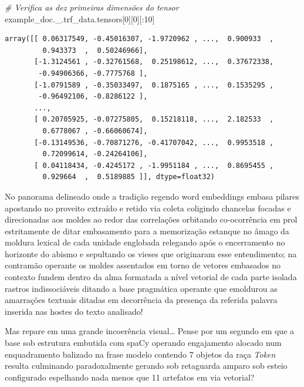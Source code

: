 \documentclass[
  brazilian,
]{article}
\newenvironment{Shaded}{}{}
\newcommand{\CommentTok}[1]{\textcolor[rgb]{0.38,0.63,0.69}{\textit{#1}}}
\newcommand{\DecValTok}[1]{\textcolor[rgb]{0.25,0.63,0.44}{#1}}
\newcommand{\NormalTok}[1]{#1}
\begin{document}
\begin{Shaded}
\begin{Highlighting}[]
\CommentTok{\# Verifica as dez primeiras dimensões do tensor}
\NormalTok{example\_doc.\_.trf\_data.tensors[}\DecValTok{0}\NormalTok{][}\DecValTok{0}\NormalTok{][:}\DecValTok{10}\NormalTok{]}
\end{Highlighting}
\end{Shaded}

\begin{verbatim}
array([[ 0.06317549, -0.45016307, -1.9720962 , ...,  0.900933  ,
         0.943373  ,  0.50246966],
       [-1.3124561 , -0.32761568,  0.25198612, ...,  0.37672338,
        -0.94906366, -0.7775768 ],
       [-1.0791589 , -0.35033497,  0.1875165 , ...,  0.1535295 ,
        -0.96492106, -0.8286122 ],
       ...,
       [ 0.20705925, -0.07275805,  0.15218118, ...,  2.182533  ,
         0.6778067 , -0.66060674],
       [-0.13149536, -0.70871276, -0.41707042, ...,  0.9953518 ,
         0.72099614, -0.24264106],
       [ 0.04118434, -0.4245172 , -1.9951184 , ...,  0.8695455 ,
         0.929664  ,  0.5189885 ]], dtype=float32)
\end{verbatim}

No panorama delineado onde a tradição regendo word embeddings embasa
pilares apostando no proveito extraído e retido via coleta coligindo
chancelas focadas e direcionadas aos moldes ao redor das correlações
orbitando co-ocorrência em prol estritamente de ditar embasamento para a
memorização estanque no âmago da moldura lexical de cada unidade
englobada relegando após o encerramento no horizonte do abismo e
sepultando os vieses que originaram esse entendimento; na contramão
operante os moldes assentados em torno de vetores embasados no contexto
fundem dentro da alma formatada a nível vetorial de cada parte isolada
rastros indissociáveis ditando a base pragmática operante que emoldurou
as amarrações textuais ditadas em decorrência da presença da referida
palavra inserida nas hostes do texto analisado!

Mas repare em uma grande incoerência visual\ldots{} Pense por um segundo
em que a base sob estrutura embutida com spaCy operando engajamento
alocado num enquadramento balizado na frase modelo contendo 7 objetos da
raça \emph{Token} resulta culminando paradoxalmente gerando sob
retaguarda amparo sob esteio configurado espelhando nada menos que 11
artefatos em via vetorial?
\end{document}
